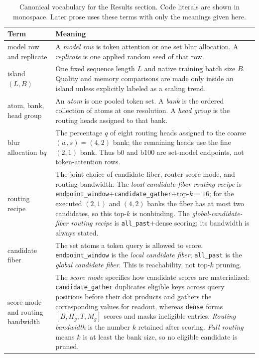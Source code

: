\documentclass{article}
\theoremstyle{plain}
\theoremstyle{definition}
\theoremstyle{remark}
\begin{document}
\begin{table}[t]
\centering
\caption{Canonical vocabulary for the Results section.  Code literals are
shown in monospace.  Later prose uses these terms with only the meanings given
here.}
\label{tab:results-glossary}
\begin{tabular}{>{\raggedright\arraybackslash}p{}>{\raggedright\arraybackslash}p{}}
\toprule
Term & Meaning \\
\midrule
model row and replicate & A \emph{model row} is token attention or one set blur allocation.  A \emph{replicate} is one applied random seed of that row. \\
island $(L,B)$ & One fixed sequence length $L$ and native training batch size $B$.  Quality and memory comparisons are made only inside an island unless explicitly labeled as a scaling trend. \\
atom, bank, head group & An \emph{atom} is one pooled token set.  A \emph{bank} is the ordered collection of atoms at one resolution.  A \emph{head group} is the routing heads assigned to that bank. \\
blur allocation b$q$ & The percentage $q$ of eight routing heads assigned to the coarse $(w,s)=(4,2)$ bank; the remaining heads use the fine $(2,1)$ bank.  Thus b0 and b100 are set-model endpoints, not token-attention rows. \\
routing recipe & The joint choice of candidate fiber, router score mode, and routing bandwidth.  The \emph{local-candidate-fiber routing recipe} is \texttt{endpoint\_window}$+$\texttt{candidate\_gather}$+$top-$k{=}16$; for the executed $(2,1)$ and $(4,2)$ banks the fiber has at most two candidates, so this top-$k$ is nonbinding.  The \emph{global-candidate-fiber routing recipe} is \texttt{all\_past}$+$dense scoring; its bandwidth is always stated. \\
candidate fiber & The set atoms a token query is allowed to score.  \texttt{endpoint\_window} is the \emph{local candidate fiber}; \texttt{all\_past} is the \emph{global candidate fiber}.  This is reachability, not top-$k$ pruning. \\
score mode and routing bandwidth & The \emph{score mode} specifies how candidate scores are materialized: \texttt{candidate\_gather} duplicates eligible keys across query positions before their dot products and gathers the corresponding values for readout, whereas \texttt{dense} forms $[B,H_g,T,M_g]$ scores and masks ineligible entries.  \emph{Routing bandwidth} is the number $k$ retained after scoring.  \emph{Full routing} means $k$ is at least the bank size, so no eligible candidate is pruned. \\

\end{tabular}
\end{table}
\end{document}
